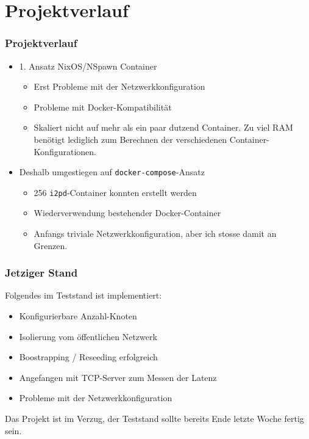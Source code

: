 \documentclass{beamer}
\begin{document}
\section{Projektverlauf}

    \begin{frame}
        \frametitle{Projektverlauf}

        \begin{itemize}
            \item 1. Ansatz NixOS/NSpawn Container
                \begin{itemize}
                    \item Erst Probleme mit der Netzwerkkonfiguration
                    \item Probleme mit Docker-Kompatibilität
                    \item Skaliert nicht auf mehr als ein paar dutzend Container. Zu viel RAM benötigt lediglich zum Berechnen der verschiedenen Container-Konfigurationen.
                \end{itemize}
            \item Deshalb umgestiegen auf \lstinline|docker-compose|-Ansatz
                \begin{itemize}
                    \item 256 \lstinline|i2pd|-Container konnten erstellt werden
                    \item Wiederverwendung bestehender Docker-Container
                    \item Anfangs triviale Netzwerkkonfiguration, aber ich stosse damit an Grenzen.
                \end{itemize}
        \end{itemize}
    \end{frame}


    \begin{frame}
        \frametitle{Jetziger Stand}

        Folgendes im Teststand ist implementiert:

        \begin{itemize}
            \item Konfigurierbare Anzahl-Knoten
            \item Isolierung vom öffentlichen Netzwerk
            \item Boostrapping / Reseeding erfolgreich
            \item Angefangen mit TCP-Server zum Messen der Latenz
            \item Probleme mit der Netzwerkkonfiguration
        \end{itemize}

        Das Projekt ist im Verzug, der Teststand sollte bereits Ende letzte Woche fertig sein.
    \end{frame}
\end{document}

